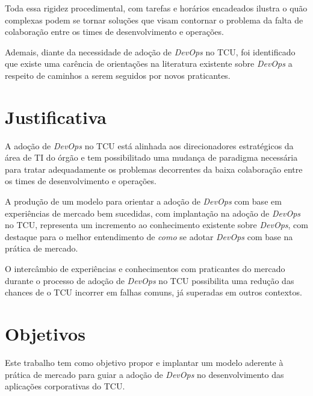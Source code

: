 Toda essa rigidez procedimental, com tarefas e horários encadeados ilustra o
quão complexas podem se tornar soluções que visam contornar o problema da falta
de colaboração entre os times de desenvolvimento e operações.

Ademais, diante da necessidade de adoção de \textit{DevOps} no TCU, foi
identificado que existe uma carência de orientações na literatura existente
sobre \textit{DevOps} a respeito de caminhos a serem seguidos por novos
praticantes.

\section{Justificativa}%

A adoção de \textit{DevOps} no \acrshort{TCU} está alinhada aos direcionadores
estratégicos da área de \acrshort{TI} do órgão e tem possibilitado uma
mudança de paradigma necessária para tratar adequadamente os problemas
decorrentes da baixa colaboração entre os times de desenvolvimento e operações.

A produção de um modelo para orientar a adoção de \textit{DevOps} com base em
experiências de mercado bem sucedidas, com implantação na adoção de
\textit{DevOps} no \acrshort{TCU}, representa um
incremento ao conhecimento existente sobre \textit{DevOps}, com destaque
para o melhor entendimento de \emph{como} se adotar \textit{DevOps} com base na
prática de mercado.

O intercâmbio de experiências e conhecimentos com praticantes do mercado
durante o processo de adoção de \textit{DevOps} no TCU possibilita uma redução
das chances de o \acrshort{TCU} incorrer em falhas comuns, já superadas em
outros contextos.

\section{Objetivos}
Este trabalho tem como objetivo propor e implantar um modelo aderente à prática
de mercado para guiar a adoção de \textit{DevOps} no desenvolvimento das
aplicações corporativas do \acrshort{TCU}.

